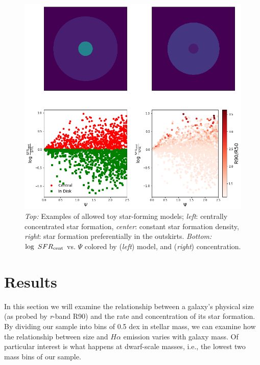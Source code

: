 \documentclass[iop]{emulateapj}
\begin{document}
\begin{figure}
	\centering
	\includegraphics[width=1.4 \columnwidth]{model.png}
	\caption{\textit{Top:} Examples of allowed toy star-forming models; \textit{left}: centrally concentrated star formation, \textit{center}: constant star formation density, \textit{right}: star formation preferentially in the outskirts. \textit{Bottom:} $\log \  SFR_{\rm cent}$ vs. $\Psi$ colored by (\textit{left}) model, and (\textit{right}) concentration.}
	\label{fig:model}
	
\end{figure}


\section{Results}
\label{sec:results}

In this section we will examine the relationship between a galaxy's physical size (as probed by \textit{r}-band R90) and the rate and concentration of its star formation. By dividing our sample into bins of 0.5 dex in stellar mass, we can examine how the relationship between size and $H\alpha$ emission varies with galaxy mass. Of particular interest is what happens at dwarf-scale masses, i.e., the lowest two mass bins of our sample.
\end{document}
